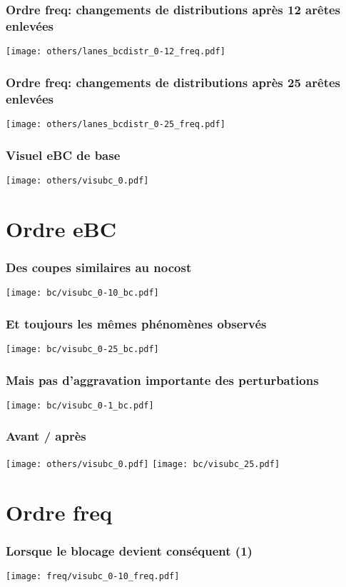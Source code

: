 \documentclass[aspectratio=169]{beamer}
\begin{document}
    \begin{frame}
        \frametitle{Ordre freq: changements de distributions après 12 arêtes enlevées}
        \centering
        \texttt{[image: others/lanes\_bcdistr\_0-12\_freq.pdf]}    
    \end{frame}

    \begin{frame}
        \frametitle{Ordre freq: changements de distributions après 25 arêtes enlevées}
        \centering
        \texttt{[image: others/lanes\_bcdistr\_0-25\_freq.pdf]}    
    \end{frame}

    \begin{frame}
        \frametitle{Visuel eBC de base}
        \centering
        \texttt{[image: others/visubc\_0.pdf]}
    \end{frame}

    \section{Ordre eBC}

    \begin{frame}
        \frametitle{Des coupes similaires au nocost}
        \texttt{[image: bc/visubc\_0-10\_bc.pdf]}
    \end{frame}

    \begin{frame}
        \frametitle{Et toujours les mêmes phénomènes observés}
        \texttt{[image: bc/visubc\_0-25\_bc.pdf]}
    \end{frame}

    \begin{frame}
        \frametitle{Mais pas d'aggravation importante des perturbations}
        \texttt{[image: bc/visubc\_0-1\_bc.pdf]}
    \end{frame}

    \begin{frame}
        \frametitle{Avant / après}
        \texttt{[image: others/visubc\_0.pdf]}
        \texttt{[image: bc/visubc\_25.pdf]}
    \end{frame}

    \section{Ordre freq}

    \begin{frame}
        \frametitle{Lorsque le blocage devient conséquent (1)}
        \texttt{[image: freq/visubc\_0-10\_freq.pdf]}
    \end{frame}
\end{document}
